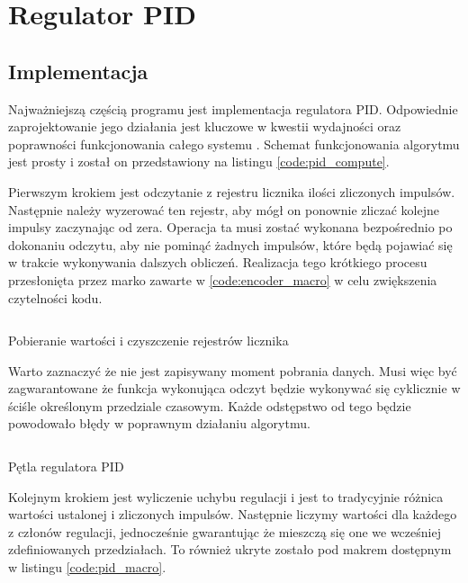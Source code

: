     \section{Regulator PID} 
    
    \subsection{Implementacja}
         Najważniejszą częścią programu jest implementacja regulatora PID. Odpowiednie zaprojektowanie jego działania jest kluczowe w kwestii wydajności oraz poprawności funkcjonowania całego systemu \cite{hor}. Schemat funkcjonowania algorytmu jest prosty i został on przedstawiony na listingu \ref{code:pid_compute}.
         
         Pierwszym krokiem jest odczytanie z rejestru licznika ilości zliczonych impulsów. Następnie należy wyzerować ten rejestr, aby mógł on ponownie zliczać kolejne impulsy zaczynając od zera. Operacja ta musi zostać wykonana bezpośrednio po dokonaniu odczytu, aby nie pominąć żadnych impulsów, które będą pojawiać się w trakcie wykonywania dalszych obliczeń. Realizacja tego krótkiego procesu przesłonięta przez marko zawarte w \ref{code:encoder_macro} w celu zwiększenia czytelności kodu. 
         
        \begin{kod}
          \inputminted[firstline=10,lastline=12]{cpp}{esp/listings/encoder_driver.hpp}
          \caption{Pobieranie wartości i czyszczenie rejestrów licznika}
          \label{code:encoder_macro}
          \vspace{1em}
        \end{kod}
         
         
         Warto zaznaczyć że nie jest zapisywany moment pobrania danych. Musi więc być zagwarantowane że funkcja wykonująca odczyt będzie wykonywać się cyklicznie w ściśle określonym przedziale czasowym. Każde odstępstwo od tego będzie powodowało błędy w poprawnym działaniu algorytmu. 
         
        \begin{kod}
          \inputminted[firstline=17,lastline=45]{cpp}{esp/listings/pid.cpp}
          \caption{Pętla regulatora PID}
          \label{code:pid_compute}
          \vspace{2em}
        \end{kod}
    
         Kolejnym krokiem jest wyliczenie uchybu regulacji i jest to tradycyjnie różnica wartości ustalonej i zliczonych impulsów. Następnie liczymy wartości dla każdego z członów regulacji, jednocześnie gwarantując że mieszczą się one we wcześniej zdefiniowanych przedziałach. To również ukryte zostało pod makrem dostępnym w listingu \ref{code:pid_macro}.
         
